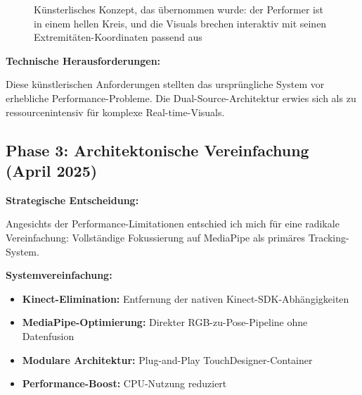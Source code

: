 \begin{figure}[htbp]
    \centering
    \caption{Künsterlisches Konzept, das übernommen wurde: der Performer ist in einem hellen Kreis, und die Visuals brechen interaktiv mit seinen Extremitäten-Koordinaten passend aus}
    \label{fig:composite_effects}
\end{figure}

\textbf{Technische Herausforderungen:}
\raggedright Diese künstlerischen Anforderungen stellten das ursprüngliche System vor erhebliche Performance-Probleme. Die Dual-Source-Architektur erwies sich als zu ressourcenintensiv für komplexe Real-time-Visuals.

\newpage

\subsection{Phase 3: Architektonische Vereinfachung (April 2025)}

\textbf{Strategische Entscheidung:}
\raggedright Angesichts der Performance-Limitationen entschied ich mich für eine radikale Vereinfachung: Vollständige Fokussierung auf MediaPipe als primäres Tracking-System.

\textbf{Systemvereinfachung:}
\begin{itemize}
    \item \textbf{Kinect-Elimination:} Entfernung der nativen Kinect-SDK-Abhängigkeiten
    \item \textbf{MediaPipe-Optimierung:} Direkter RGB-zu-Pose-Pipeline ohne Datenfusion
    \item \textbf{Modulare Architektur:} Plug-and-Play TouchDesigner-Container
    \item \textbf{Performance-Boost:} CPU-Nutzung reduziert
\end{itemize}

